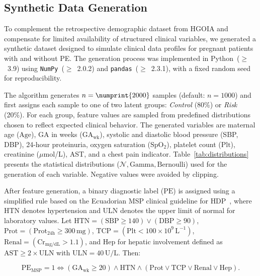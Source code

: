 \documentclass[diagnostics,article,submit,pdftex,moreauthors]{Definitions/mdpi}
\begin{document}
\subsection{Synthetic Data Generation}
\label{sec:synth-data-gener}

To complement the retrospective demographic dataset from \ac{HGOIA} and compensate for
limited availability of structured clinical variables, we generated a
synthetic dataset designed to simulate clinical data profiles for
pregnant patients with and without \ac{PE}. The generation process was
implemented in Python~($\ge$~3.9) using \texttt{NumPy}~($\ge$~2.0.2) and
\texttt{pandas}~($\ge$~2.3.1), with a fixed random seed for reproducibility.

The algorithm generates $n=\numprint{2000}$ samples (default: $n=1000$) and first
assigns each sample to one of two latent groups: \textit{Control}
(80\%) or \textit{Risk} (20\%). For each group, feature values are
sampled from predefined distributions chosen to reflect expected
clinical behavior. The generated variables are maternal age
($\mathrm{Age}$), \ac{GA} in weeks ($\mathrm{GA_{wk}}$),
systolic and diastolic blood pressure (\ac{SBP}, \ac{DBP}),
24-hour proteinuria, oxygen saturation ($\mathrm{SpO_2}$),
platelet count ($\mathrm{Plt}$), creatinine ($\mu$mol/L),
\ac{AST}, and a chest pain indicator.
Table~\ref{tab:distributions} presents the statistical
distributions ($\mathcal{N}, \text{Gamma}, \text{Bernoulli}$) used
for the generation of each variable. Negative values were avoided
by clipping.

After feature generation, a binary diagnostic label
($\mathrm{PE}$) is assigned using a simplified rule based on the
Ecuadorian \ac{MSP} clinical guideline for \ac{HDP}~\cite{msp_ecuador_hdp_2013},
where \ac{HTN} denotes hypertension and \ac{ULN} denotes the upper limit of
normal for laboratory values.
Let \(\mathrm{HTN}=(\mathrm{SBP}\geq 140)\lor(\mathrm{DBP}\geq 90)\),
\(\mathrm{Prot}=(\mathrm{Prot_{24h}}\geq 300\,\mathrm{mg})\),
\(\mathrm{TCP}=(\mathrm{Plt}<100\times10^{9}\,\mathrm{L}^{-1})\),
\(\mathrm{Renal}=(\mathrm{Cr}_{\mathrm{mg/dL}}>1.1)\), and
\(\mathrm{Hep}\) for hepatic involvement defined as
\(\mathrm{AST}\geq 2\times\mathrm{ULN}\) with
\(\mathrm{ULN}=40\,\mathrm{U/L}\). Then:

\begin{linenomath}
\begin{equation}
\mathrm{PE}_{\mathrm{MSP}}=1
\iff
(\mathrm{GA_{wk}}\geq 20)\land \mathrm{HTN}
\land (\mathrm{Prot}\lor \mathrm{TCP}\lor \mathrm{Renal}\lor \mathrm{Hep}).
\label{eq:preeclampsia-msp-rule}
\end{equation}
\end{linenomath}
\end{document}
